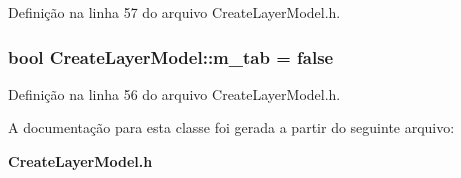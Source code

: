 Definição na linha 57 do arquivo Create\+Layer\+Model.\+h.

\subsubsection[{m\+\_\+tab}]{\setlength{\rightskip}{0pt plus 5cm}bool Create\+Layer\+Model\+::m\+\_\+tab = false\hspace{0.3cm}{\ttfamily [protected]}}\label{class_create_layer_model_a20c69e497cde921350738937d7066ec3}


Definição na linha 56 do arquivo Create\+Layer\+Model.\+h.



A documentação para esta classe foi gerada a partir do seguinte arquivo\+:\begin{DoxyCompactItemize}
\item 
{\bf Create\+Layer\+Model.\+h}\end{DoxyCompactItemize}
